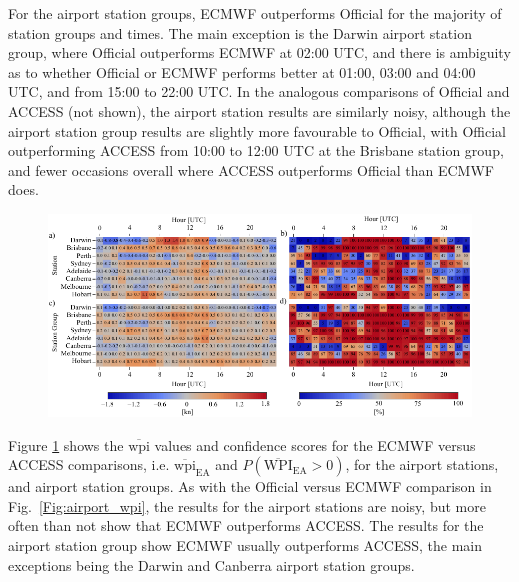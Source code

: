 \documentclass{ametsoc}
\begin{document}
For the airport station groups, ECMWF outperforms Official for the majority of station groups and times. The main exception is the Darwin airport station group, where Official outperforms ECMWF at 02:00 UTC, and there is ambiguity as to whether Official or ECMWF performs better at 01:00, 03:00 and 04:00 UTC, and from 15:00 to 22:00 UTC. In the analogous comparisons of Official and ACCESS (not shown), the airport station results are similarly noisy, although the airport station group results are slightly more favourable to Official, with Official outperforming ACCESS from 10:00 to 12:00 UTC at the Brisbane station group, and fewer occasions overall where ACCESS outperforms Official than ECMWF does. 

\begin{figure}
\centering
\includegraphics[width=39pc]{airport_wpi_EA.pdf}
\label{Fig:airport_wpi_EA}
\end{figure}

Figure \ref{Fig:airport_wpi_EA} shows the $\overline{\text{wpi}}$ values and confidence scores for the ECMWF versus ACCESS comparisons, i.e. $\overline{\text{wpi}}_\text{EA}$ and $P\left(\overline{\text{WPI}}_\text{EA}>0\right)$, for the airport stations, and airport station groups. As with the Official versus ECMWF comparison in Fig.~\ref{Fig:airport_wpi}, the results for the airport stations are noisy, but more often than not show that ECMWF outperforms ACCESS. The results for the airport station group show ECMWF usually outperforms ACCESS, the main exceptions being the Darwin and Canberra airport station groups. 
\end{document}
